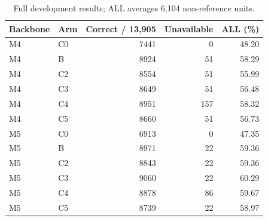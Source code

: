 \begin{table}
\caption{Full development results; ALL averages 6,104 non-reference units.}
\label{tab:main_results}
\begin{tabular}{llrrr}
\toprule
Backbone & Arm & Correct / 13,905 & Unavailable & ALL (\%) \\
\midrule
M4 & C0 & 7441 & 0 & 48.20 \\
M4 & B & 8924 & 51 & 58.29 \\
M4 & C2 & 8554 & 51 & 55.99 \\
M4 & C3 & 8649 & 51 & 56.48 \\
M4 & C4 & 8951 & 157 & 58.32 \\
M4 & C5 & 8660 & 51 & 56.73 \\
M5 & C0 & 6913 & 0 & 47.35 \\
M5 & B & 8971 & 22 & 59.36 \\
M5 & C2 & 8843 & 22 & 59.36 \\
M5 & C3 & 9060 & 22 & 60.29 \\
M5 & C4 & 8878 & 86 & 59.67 \\
M5 & C5 & 8739 & 22 & 58.97 \\
\bottomrule
\end{tabular}
\end{table}
